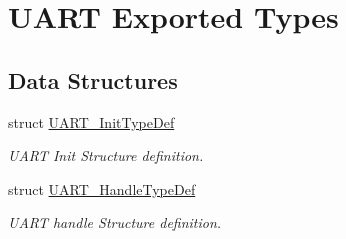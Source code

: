 \hypertarget{group___u_a_r_t___exported___types}{}\section{U\+A\+RT Exported Types}
\label{group___u_a_r_t___exported___types}
\subsection*{Data Structures}
\begin{DoxyCompactItemize}
\item 
struct \hyperlink{struct_u_a_r_t___init_type_def}{U\+A\+R\+T\+\_\+\+Init\+Type\+Def}
\begin{DoxyCompactList}\small\item\em U\+A\+RT Init Structure definition. \end{DoxyCompactList}\item 
struct \hyperlink{struct_u_a_r_t___handle_type_def}{U\+A\+R\+T\+\_\+\+Handle\+Type\+Def}
\begin{DoxyCompactList}\small\item\em U\+A\+RT handle Structure definition. \end{DoxyCompactList}\end{DoxyCompactItemize}
